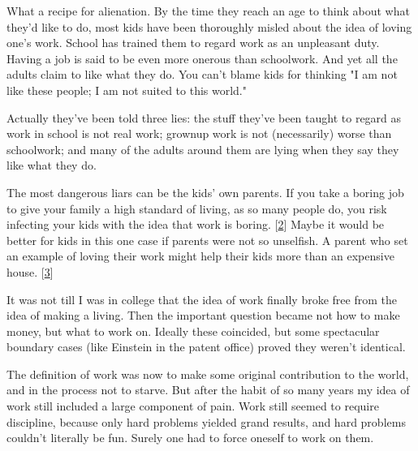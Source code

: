 What
                    a recipe for alienation. By the time they reach an age to
                    think about what they'd like to do, most kids have been
                    thoroughly misled about the idea of loving one's work.
                    School has trained them to regard work as an unpleasant
                    duty. Having a job is said to be even more onerous than
                    schoolwork. And yet all the adults claim to like what they
                    do. You can't blame kids for thinking "I am not like these
                    people; I am not suited to this world."

Actually
                    they've been told three lies: the stuff they've been taught
                    to regard as work in school is not real work; grownup work
                    is not (necessarily) worse than schoolwork; and many of the
                    adults around them are lying when they say they like what
                    they do.

The most dangerous liars can be the
                    kids' own parents. If you take a boring job to give your
                    family a high standard of living, as so many people do, you
                    risk infecting your kids with the idea that work is boring.
                    [\href{\#f2n}{2}]
                    Maybe it would be better for kids in this one case if
                    parents were not so unselfish. A parent who set an example
                    of loving their work might help their kids more than an
                    expensive house.
                    [\href{\#f3n}{3}]

It was not till I was in college that the idea
                    of work finally broke free from the idea of making a living.
                    Then the important question became not how to make money,
                    but what to work on. Ideally these coincided, but some
                    spectacular boundary cases (like Einstein in the patent
                    office) proved they weren't identical.

The
                    definition of work was now to make some original
                    contribution to the world, and in the process not to starve.
                    But after the habit of so many years my idea of work still
                    included a large component of pain. Work still seemed to
                    require discipline, because only hard problems yielded grand
                    results, and hard problems couldn't literally be fun. Surely
                    one had to force oneself to work on them.

